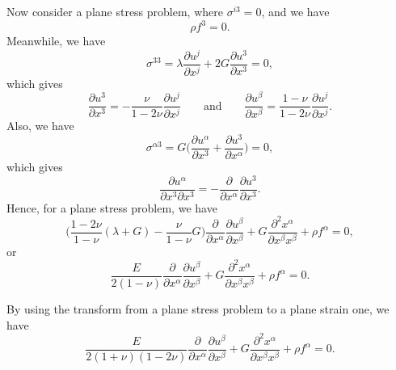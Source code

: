 \documentclass{article}
\begin{document}
Now consider a plane stress problem, where $\sigma^{i3} = 0$,
and we have
\begin{equation}
  \rho \! f^3 = 0.
\end{equation}
Meanwhile, we have
\[
  \sigma^{33} =
  \lambda \frac{\partial u^j}{\partial x^j} + 
  2 G \frac{\partial u^3}{\partial x^3} = 0, 
\]
which gives
\[
  \frac{\partial u^3}{\partial x^3} =
  -\frac{\nu}{1 - 2\nu} \frac{\partial u^j}{\partial x^j}
  \qquad \text{and} \qquad
  \frac{\partial u^\beta}{\partial x^\beta} =
  \frac{1 - \nu}{1 - 2\nu} \frac{\partial u^j}{\partial x^j}.
\]
Also, we have
\[
  \sigma^{\alpha 3} =
  G \biggl( \frac{\partial u^\alpha}{\partial x^3} +
  \frac{\partial u^3}{\partial x^\alpha} \biggr) = 0,
\]
which gives
\[
  \frac{\partial u^\alpha}{\partial x^3 \partial x^3} =
  - \frac{\partial}{\partial x^\alpha} \frac{\partial u^3}{\partial x^3}.
\]
Hence, for a plane stress problem, we have
\[
  \biggl( \frac{1 - 2\nu}{1 - \nu} (\lambda + G) -
  \frac{\nu}{1 - \nu} G \biggr)
  \frac{\partial}{\partial x^\alpha}
  \frac{\partial u^\beta}{\partial x^\beta} +
  G \frac{\partial^2 x^\alpha}{\partial x^\beta x^\beta} +
  \rho \! f^\alpha = 0,
\]
or
\begin{equation}
  \frac{E}{2(1 - \nu)} \frac{\partial}{\partial x^\alpha}
  \frac{\partial u^\beta}{\partial x^\beta} +
  G \frac{\partial^2 x^\alpha}{\partial x^\beta x^\beta} +
  \rho \! f^\alpha = 0.
\end{equation}

By using the transform from a plane stress problem to a plane strain one,
we have
\begin{equation}
  \frac{E}{2(1 + \nu)(1 - 2\nu)} \frac{\partial}{\partial x^\alpha}
  \frac{\partial u^\beta}{\partial x^\beta} +
  G \frac{\partial^2 x^\alpha}{\partial x^\beta x^\beta} +
  \rho \! f^\alpha = 0.
\end{equation}
\end{document}
